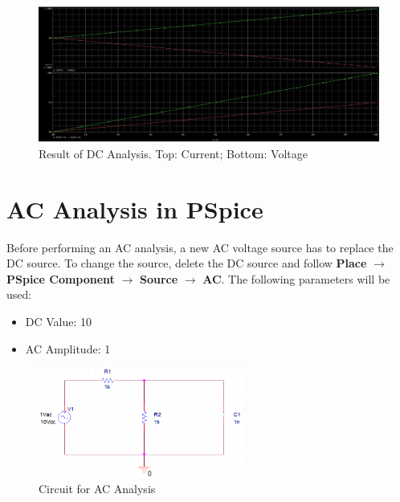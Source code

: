 \documentclass[12pt]{../manual}
\begin{document}
\begin{figure}[ht!]
\begin{center}
\includegraphics[width=\textwidth]{figures/ResultDCAnalysisCrop.PNG}
\caption[Result of DC Analysis]{Result of DC Analysis. Top: Current; Bottom: Voltage}
\label{fig:dcAnalRes}
\end{center}
\end{figure}
%
\newpage
\section{AC Analysis in PSpice}
Before performing an AC analysis, a new AC voltage source has to replace the DC source. To change the source, delete the DC source and follow \textbf{Place} $\to$ \textbf{PSpice Component} $\to$ \textbf{Source} $\to$ \textbf{AC}. The following parameters will be used:
\begin{itemize}
\item DC Value: 10
\item AC Amplitude: 1
\end{itemize}

\begin{figure}[ht!]
	\begin{center}
		\includegraphics[width=0.6\textwidth]{figures/ACAnalysisCircuitCrop.PNG}
	\end{center}
	\caption{Circuit for AC Analysis}
	\label{fig:ac}
\end{figure}
\end{document}
